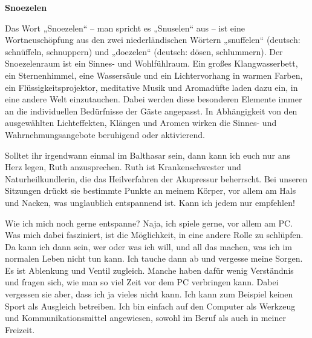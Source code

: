 \documentclass[fontsize=14pt,a4paper,headinclude,DIV=calc,automark]{scrbook}
\begin{document}
\begin{mdframed}[
    linewidth=0.3pt,         %
    linecolor=rahmenlinie,   %
    leftmargin=0, rightmargin=0,
    innertopmargin=12pt, innerbottommargin=12pt,
    innerleftmargin=12pt, innerrightmargin=12pt,
    backgroundcolor=white
]
\small\sffamily
\setlength{\parindent}{0pt} %

\textbf{Snoezelen}

\vspace{0.5\baselineskip}

Das Wort „Snoezelen“ – man spricht es „Snuselen“ aus – ist eine Wortneuschöpfung aus den zwei niederländischen Wörtern „snuffelen“ (deutsch: schnüffeln, schnuppern) und „doezelen“ (deutsch: dösen, schlummern). Der Snoezelenraum ist ein Sinnes- und Wohlfühlraum. Ein großes Klangwasserbett, ein Sternenhimmel, eine Wassersäule und ein Lichtervorhang in warmen Farben, ein Flüssigkeitsprojektor, meditative Musik und Aromadüfte laden dazu ein, in eine andere Welt einzutauchen. Dabei werden diese besonderen Elemente immer an die individuellen Bedürfnisse der Gäste angepasst. In Abhängigkeit von den ausgewählten Lichteffekten, Klängen und Aromen wirken die Sinnes- und Wahrnehmungsangebote beruhigend oder aktivierend.

\end{mdframed}

Solltet ihr irgendwann einmal im Balthasar sein, dann kann ich euch nur ans Herz legen, Ruth anzusprechen. Ruth ist Krankenschwester und Naturheilkundlerin, die das Heilverfahren der Akupressur beherrscht. Bei unseren Sitzungen drückt sie bestimmte Punkte an meinem Körper, vor allem am Hals und Nacken, was unglaublich entspannend ist. Kann ich jedem nur empfehlen!

Wie ich mich noch gerne entspanne? Naja, ich spiele gerne, vor allem am PC. Was mich dabei fasziniert, ist die Möglichkeit, in eine andere Rolle zu schlüpfen. Da kann ich dann sein, wer oder was ich will, und all das machen, was ich im normalen Leben nicht tun kann. Ich tauche dann ab und vergesse meine Sorgen. Es ist Ablenkung und Ventil zugleich. Manche haben dafür wenig Verständnis und fragen sich, wie man so viel Zeit vor dem PC verbringen kann. Dabei vergessen sie aber, dass ich ja vieles nicht kann. Ich kann zum Beispiel keinen Sport als Ausgleich betreiben. Ich bin einfach auf den Computer als Werkzeug und Kommunikationsmittel angewiesen, sowohl im Beruf als auch in meiner Freizeit.
\end{document}
